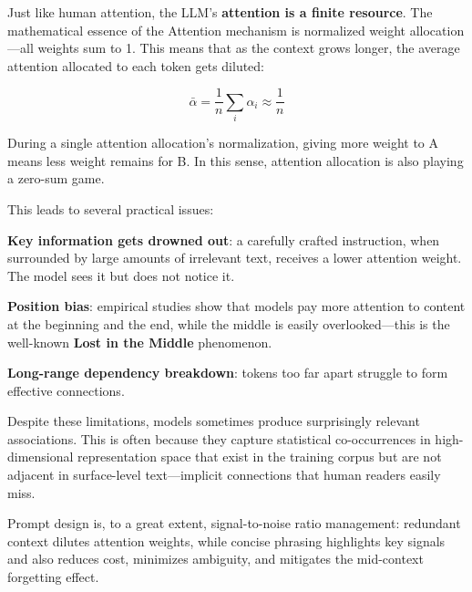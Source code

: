 Just like human attention, the LLM's \textbf{attention is a finite resource}. The mathematical essence of the Attention mechanism is normalized weight allocation---all weights sum to 1. This means that as the context grows longer, the average attention allocated to each token gets diluted:

\begin{equation*}
\bar{\alpha} = \frac{1}{n} \sum_i \alpha_i \approx \frac{1}{n}
\end{equation*}

\begin{importantbox}
During a single attention allocation's normalization, giving more weight to A means less weight remains for B.
In this sense, attention allocation is also playing a zero-sum game.

\end{importantbox}

This leads to several practical issues:

\textbf{Key information gets drowned out}: a carefully crafted instruction, when surrounded by large amounts of irrelevant text, receives a lower attention weight. The model sees it but does not notice it.

\textbf{Position bias}: empirical studies show that models pay more attention to content at the beginning and the end, while the middle is easily overlooked---this is the well-known \textbf{Lost in the Middle} phenomenon.

\textbf{Long-range dependency breakdown}: tokens too far apart struggle to form effective connections.

\vspace{1em}

Despite these limitations, models sometimes produce surprisingly relevant associations. This is often because they capture statistical co-occurrences in high-dimensional representation space that exist in the training corpus but are not adjacent in surface-level text---implicit connections that human readers easily miss.

\vspace{1em}

Prompt design is, to a great extent, signal-to-noise ratio management: redundant context dilutes attention weights, while concise phrasing highlights key signals and also reduces cost, minimizes ambiguity, and mitigates the mid-context forgetting effect.


